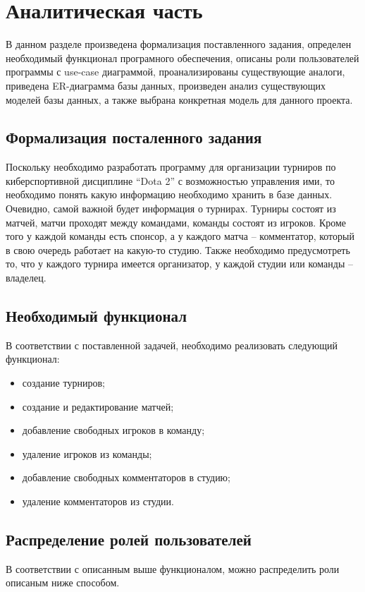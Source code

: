 \chapter{Аналитическая часть}

В данном разделе произведена формализация поставленного задания, определен необходимый функционал програмного обеспечения, описаны роли пользователей программы с use-case диаграммой, проанализированы существующие аналоги, приведена ER-диаграмма базы данных, произведен анализ существующих моделей базы данных, а также выбрана конкретная модель для данного проекта.

\section{Формализация посталенного задания}
Поскольку необходимо разработать программу для организации турниров по киберспортивной дисциплине “Dota 2” с возможностью управления ими, то необходимо понять какую информацию необходимо хранить в базе данных. Очевидно, самой важной будет информация о турнирах. Турниры состоят из матчей, матчи проходят между командами, команды состоят из игроков. Кроме того у каждой команды есть спонсор, а у каждого матча -- комментатор, который в свою очередь работает на какую-то студию. Также необходимо предусмотреть то, что у каждого турнира имеется организатор, у каждой студии или команды -- владелец.

\section{Необходимый функционал}
В соответствии с поставленной задачей, необходимо реализовать следующий функционал:
\begin{itemize}
	\item создание турниров;
	\item создание и редактирование матчей;
	\item добавление свободных игроков в команду;
	\item удаление игроков из команды;
	\item добавление свободных комментаторов в студию;
	\item удаление комментаторов из студии.
\end{itemize}

\section{Распределение ролей пользователей}
В соответствии с описанным выше функционалом, можно распределить роли описаным ниже способом.

